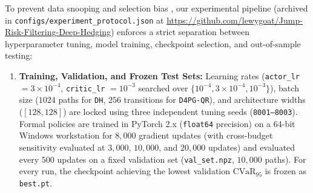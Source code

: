 \documentclass[11pt,a4paper]{article}
\begin{document}
To prevent data snooping and selection bias \citep{Mikkila2023,Francois2025}, our experimental pipeline (archived in \texttt{configs/experiment\_protocol.json} at \url{https://github.com/lewygoat/Jump-Risk-Filtering-Deep-Hedging}) enforces a strict separation between hyperparameter tuning, model training, checkpoint selection, and out-of-sample testing:
\begin{enumerate}
  \item \textbf{Training, Validation, and Frozen Test Sets:} Learning rates (\texttt{actor\_lr} $= 3 \times 10^{-4}$, \texttt{critic\_lr} $= 10^{-3}$ searched over $\{10^{-4}, 3 \times 10^{-4}, 10^{-3}\}$), batch size ($1024$ paths for \texttt{DH}, $256$ transitions for \texttt{D4PG-QR}), and architecture widths ($[128, 128]$) are locked using three independent tuning seeds (\texttt{8001--8003}). Formal policies are trained in PyTorch 2.x (\texttt{float64} precision) on a 64-bit Windows workstation for $8,000$ gradient updates (with cross-budget sensitivity evaluated at $3,000$, $10,000$, and $20,000$ updates) and evaluated every $500$ updates on a fixed validation set (\texttt{val\_set.npz}, $10,000$ paths). For every run, the checkpoint achieving the lowest validation $\text{CVaR}_{95}$ is frozen as \texttt{best.pt}.

\end{enumerate}
\end{document}
